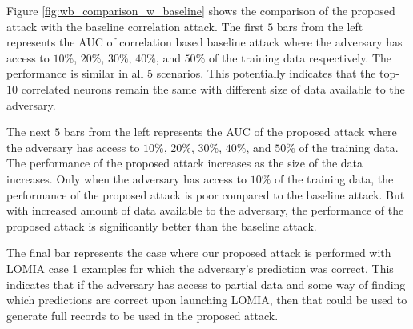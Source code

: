 \documentclass{article}
\begin{document}
Figure \ref{fig:wb_comparison_w_baseline} shows the comparison of the proposed attack with the baseline correlation attack.
The first $5$ bars from the left represents the AUC of correlation based baseline attack where the adversary has access to $10\%$, $20\%$, $30\%$, $40\%$, and $50\%$ of the training data respectively.
The performance is similar in all 5 scenarios.
This potentially indicates that the top-$10$ correlated neurons remain the same with different size of data available to the adversary.

The next $5$ bars from the left represents the AUC of the proposed attack where the adversary has access to $10\%$, $20\%$, $30\%$, $40\%$, and $50\%$ of the training data.
The performance of the proposed attack increases as the size of the data increases.
Only when the adversary has access to $10\%$ of the training data, the performance of the proposed attack is poor compared to the baseline attack.
But with increased amount of data available to the adversary, the performance of the proposed attack is significantly better than the baseline attack.

The final bar represents the case where our proposed attack is performed with LOMIA case 1 examples for which the adversary's prediction was correct.
This indicates that if the adversary has access to partial data and some way of finding which predictions are correct upon launching LOMIA, then that could be used to generate full records to be used in the proposed attack.
\end{document}
